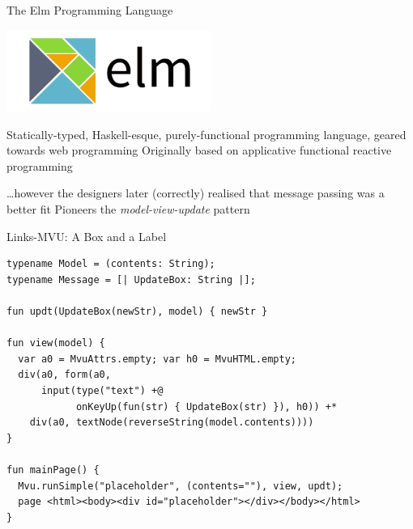 \documentclass[11.5pt, aspectratio=169]{beamer}
\begin{document}
\begin{frame}{The Elm Programming Language}

  \begin{center}
    \includegraphics[width=0.5\textwidth]{images/ElmLogo.png}
  \end{center}

  \begin{fullpageitemize}
  \itemR Statically-typed, Haskell-esque, purely-functional programming language, geared towards web programming
  \itemR Originally based on applicative functional reactive programming
    \begin{itemize}
      \itemR \ldots however the designers later (correctly) realised that message passing was a better fit
      \itemR Pioneers the \emph{model-view-update} pattern
    \end{itemize}
  \end{fullpageitemize}

\end{frame}

\begin{frame}[fragile]{Links-MVU: A Box and a Label}
\begin{lstlisting}[language=Links]
typename Model = (contents: String);
typename Message = [| UpdateBox: String |];

fun updt(UpdateBox(newStr), model) { newStr }

fun view(model) {
  var a0 = MvuAttrs.empty; var h0 = MvuHTML.empty;
  div(a0, form(a0,
      input(type("text") +@
            onKeyUp(fun(str) { UpdateBox(str) }), h0)) +*
    div(a0, textNode(reverseString(model.contents))))
}

fun mainPage() {
  Mvu.runSimple("placeholder", (contents=""), view, updt);
  page <html><body><div id="placeholder"></div></body></html>
}
\end{lstlisting}
\end{frame}
\end{document}
